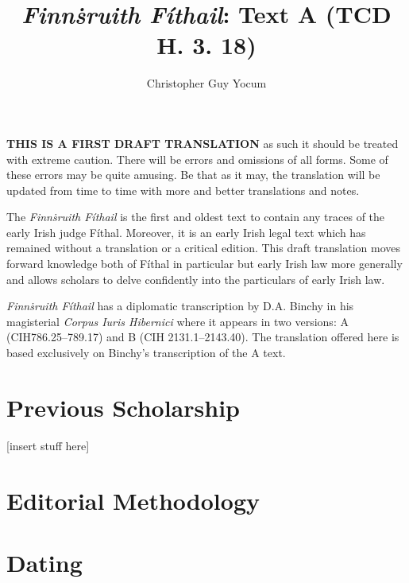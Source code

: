\documentclass[11pt]{article}
\author{Christopher Guy Yocum}
\title{\emph{Finn\.{s}ruith F\'{i}thail}: Text A (TCD H. 3. 18)}
\begin{document}
\maketitle

{\Large \textbf{THIS IS A FIRST DRAFT TRANSLATION} as such it should be treated with extreme caution.  There will be errors and omissions of all forms.  Some of these errors may be quite amusing.  Be that as it may, the translation will be updated from time to time with more and better translations and notes.}

The \emph{Finn\.{s}ruith F\'{i}thail} is the first and oldest text to contain any traces of the early Irish judge F\'{i}thal.  Moreover, it is an early Irish legal text which has remained without a translation or a critical edition.  This draft translation moves forward knowledge both of F\'{i}thal in particular but early Irish law more generally and allows scholars to delve confidently into the particulars of early Irish law.

\emph{Finn\.{s}ruith F\'{i}thail} has a diplomatic transcription by D.A. Binchy in his magisterial \emph{Corpus Iuris Hibernici} where it appears in two versions: A (CIH786.25--789.17) and B (CIH 2131.1--2143.40).  The translation offered here is based exclusively on Binchy's transcription of the A text.

\section{Previous Scholarship}

[insert stuff here]

\section{Editorial Methodology}



\section{Dating}

\newpage
\end{document}
